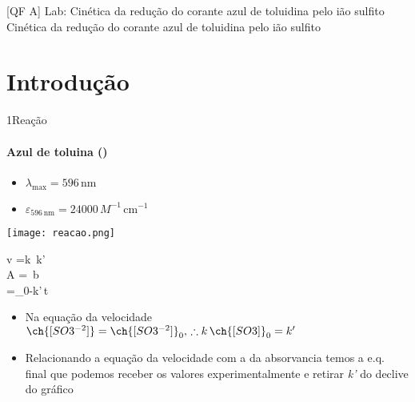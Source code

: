 \documentclass[\mainfilename]{subfiles}
\begin{document}
\graphicspath{{\subfix{./.build/figures/QF_A-Lab.3}}}

[QF A]
{Lab: Cinética da redução do corante azul de toluidina pelo ião sulfito} %
{Cinética da redução do corante azul de toluidina pelo ião sulfito} %

\part*{Introdução}

\begin{sectionBox}1{Reação} %
    
    \subsection*{Azul de toluina ()}
    \begin{itemize}
        \item \(\lambda_{\max}=596\,\unit{\nano\metre}\)
        \item \(\varepsilon_{596\,\unit{\nano\metre}} = 24000\,\unit{M^{-1}\,\centi\metre^{-1}}\)
    \end{itemize}

    \begin{center}
        \texttt{[image: reacao.png]}
    \end{center}

    \vspace{-3ex}
    \begin{BM}
        v
        =k\,
        \cong k'\,\ch{[TB^+]}
        \\
        A = \varepsilon\,b\,\ch{[TB^+]}
        \\[2ex]
        \implies
        =_0-k'\,t
    \end{BM}

    \begin{itemize}
        \item Na equação da velocidade \(\ch{[SO3^{-2}]}=\ch{[SO3^{-2}]}_0,\,\therefore k\,\ch{[SO3]}_0=k'\)
        \item Relacionando a equação da velocidade com a da absorvancia temos a e.q. final que podemos receber os valores experimentalmente e retirar \textit{k'} do declive do gráfico
    \end{itemize}
    
\end{sectionBox}
\end{document}
